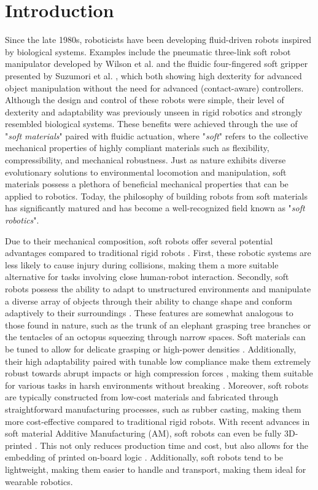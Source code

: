 \section{Introduction}
\label{sec:introduction}
Since the late 1980s, roboticists have been developing fluid-driven robots inspired by biological systems. Examples include the pneumatic three-link soft robot manipulator developed by Wilson et al. \cite{Wilson1989Jun,Weisburd1988,Wilson2007} and the fluidic four-fingered soft gripper presented by Suzumori et al. \cite{Suzumori1991,Suzumori1992}, which both showing high dexterity for advanced object manipulation without the need for advanced (contact-aware) controllers. Although the design and control of these robots were simple, their level of dexterity and adaptability was previously unseen in rigid robotics and strongly resembled biological systems. These benefits were achieved through the use of "\textit{soft materials}" paired with fluidic actuation, where "\textit{soft}" refers to the collective mechanical properties of highly compliant materials such as flexibility, compressibility, and mechanical robustness. Just as nature exhibits diverse evolutionary solutions to environmental locomotion and manipulation, soft materials possess a plethora of beneficial mechanical properties that can be applied to robotics. Today, the philosophy of building robots from soft materials has significantly matured and has become a well-recognized field known as "\textit{soft robotics}".

Due to their mechanical composition, soft robots offer several potential advantages compared to traditional rigid robots \cite{Rus2015}. First, these robotic systems are less likely to cause injury during collisions, making them a more suitable alternative for tasks involving close human-robot interaction. Secondly, soft robots possess the ability to adapt to unstructured environments and manipulate a diverse array of objects through their ability to change shape and conform adaptively to their surroundings \cite{Hughes2016Nov,Marchese2015}. These features are somewhat analogous to those found in nature, such as the trunk of an elephant grasping tree branches or the tentacles of an octopus squeezing through narrow spaces. Soft materials can be tuned to allow for delicate grasping \cite{Sinatra2019Aug,Galloway2016} or high-power densities \cite{Li2017Dec}. Additionally, their high adaptability paired with tunable low compliance make them extremely robust towards abrupt impacts or high compression forces \cite{Bartlett2015Jul}, making them suitable for various tasks in harsh environments without breaking \cite{Hawkes2017,Li2021Mar,Tolley2014Sep}. Moreover, soft robots are typically constructed from low-cost materials and fabricated through straightforward manufacturing processes, such as rubber casting, making them more cost-effective compared to traditional rigid robots. With recent advances in soft material Additive Manufacturing (AM), soft robots can even be fully 3D-printed \cite{Wallin2018Jun,Xavier2022Jun}. This not only reduces production time and cost, but also allows for the embedding of printed on-board logic \cite{Hubbard2021,Wehner2016}. Additionally, soft robots tend to be lightweight, making them easier to handle and transport, making them ideal for wearable robotics.

